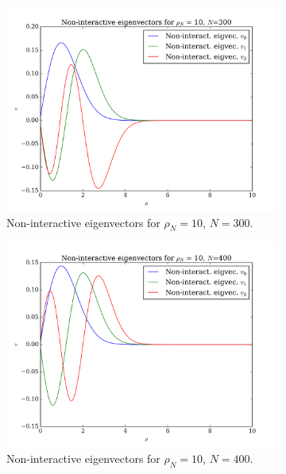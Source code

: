 \documentclass[11pt,a4paper,notitlepage]{article}
\begin{document}
\begin{figure}[H]
\begin{subfigure}[t]{0.45\textwidth}
	\end{subfigure}
	\begin{subfigure}[b]{0.45\textwidth}
		\includegraphics[scale=0.40]{../non_interacting_eigvec_plot_rhoN=10_N=300.png}
		\caption{Non-interactive eigenvectors for $\rho_N = 10$, $N = 300$.}\label{fig:eigvecs-non-interact-10-300}
	\end{subfigure}
	\hfill
	\begin{subfigure}[b]{0.45\textwidth}
		\includegraphics[scale=0.40]{../non_interacting_eigvec_plot_rhoN=10_N=400.png}
		\caption{Non-interactive eigenvectors for $\rho_N = 10$, $N = 400$.}\label{fig:eigvecs-non-interact-10-400}
	\end{subfigure}
\begin{subfigure}[t]{0.45\textwidth}

\end{subfigure}
\end{figure}
\end{document}
